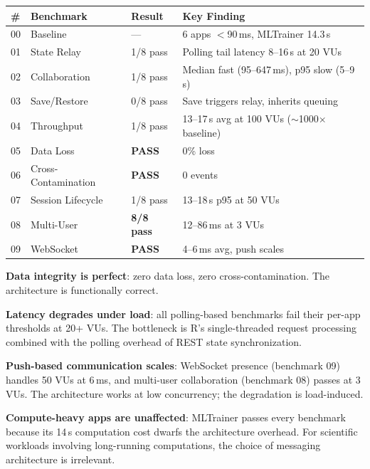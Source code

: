 \documentclass[11pt,a4paper]{article}
\begin{document}
\begin{center}
\begin{tabular}{llll}
\toprule
\textbf{\#} & \textbf{Benchmark} & \textbf{Result} & \textbf{Key Finding} \\
\midrule
00 & Baseline           & ---  & 6 apps $<$90\,ms, MLTrainer 14.3\,s \\
01 & State Relay        & 1/8 pass & Polling tail latency 8--16\,s at 20 VUs \\
02 & Collaboration      & 1/8 pass & Median fast (95--647\,ms), p95 slow (5--9\,s) \\
03 & Save/Restore       & 0/8 pass & Save triggers relay, inherits queuing \\
04 & Throughput         & 1/8 pass & 13--17\,s avg at 100 VUs ($\sim$1000$\times$ baseline) \\
05 & Data Loss          & \textbf{PASS} & 0\% loss \\
06 & Cross-Contamination & \textbf{PASS} & 0 events \\
07 & Session Lifecycle  & 1/8 pass & 13--18\,s p95 at 50 VUs \\
08 & Multi-User         & \textbf{8/8 pass} & 12--86\,ms at 3 VUs \\
09 & WebSocket          & \textbf{PASS} & 4--6\,ms avg, push scales \\
\bottomrule
\end{tabular}
\end{center}

\noindent \textbf{Data integrity is perfect}: zero data loss, zero
cross-contamination. The architecture is functionally correct.

\noindent \textbf{Latency degrades under load}: all polling-based
benchmarks fail their per-app thresholds at 20+ VUs. The bottleneck
is R's single-threaded request processing combined with the polling
overhead of REST state synchronization.

\noindent \textbf{Push-based communication scales}: WebSocket presence
(benchmark 09) handles 50 VUs at 6\,ms, and multi-user collaboration
(benchmark 08) passes at 3 VUs. The architecture works at low
concurrency; the degradation is load-induced.

\noindent \textbf{Compute-heavy apps are unaffected}: MLTrainer passes
every benchmark because its 14\,s computation cost dwarfs the
architecture overhead. For scientific workloads involving long-running
computations, the choice of messaging architecture is irrelevant.

\end{document}
